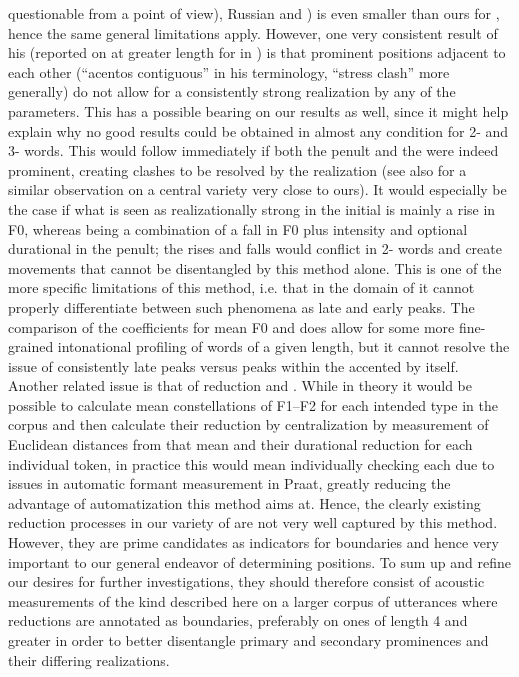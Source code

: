 \documentclass[output=paper]{LSP/langsci}
\begin{document}
questionable from a  point of view), Russian and ) is even smaller than ours for , hence the same general limitations apply. However, one very consistent result of his (reported on at greater length for  in \citealt{PamiesBertran1994}) is that prominent positions adjacent to each other (“acentos contiguous” in his terminology, “stress clash” more generally) do not allow for a consistently strong realization by any of the parameters. This has a possible bearing on our results as well, since it might help explain why no good results could be obtained in almost any condition for 2- and 3- words. This would follow immediately if both the penult and the  were indeed prominent, creating clashes to be resolved by the  realization (see also \citealt{Hintz2006} for a similar observation on a central  variety very close to ours). It would especially be the case if what is seen as realizationally strong in the initial is mainly a rise in F0, whereas being a combination of a fall in F0 plus intensity and optional durational  in the penult; the rises and falls would conflict in 2- words and create movements that cannot be disentangled by this method alone. This is one of the more specific limitations of this method, i.e. that in the domain of  it cannot properly differentiate between such phenomena as late and early peaks. The comparison of the coefficients for mean F0 and  does allow for some more fine-grained intonational profiling of words of a given length, but it cannot resolve the issue of consistently late peaks versus peaks within the accented  by itself. Another related issue is that of reduction and . While in theory it would be possible to calculate mean constellations of F1--F2 for each intended  type in the corpus and then calculate their reduction by centralization by measurement of Euclidean distances from that mean and their durational reduction for each individual  token, in practice this would mean individually checking each  due to issues in automatic formant measurement in {Praat}, greatly reducing the advantage of automatization this method aims at. Hence, the clearly existing reduction processes in our variety of  are not very well captured by this method. However, they are prime candidates as indicators for  boundaries and hence very important to our general endeavor of determining  positions. To sum up and refine our desires for further investigations, they should therefore consist of acoustic measurements of the kind described here on a larger corpus of utterances where reductions are annotated as  boundaries, preferably on ones of  length 4 and greater in order to better disentangle primary and secondary prominences and their differing realizations.    
\end{document}
